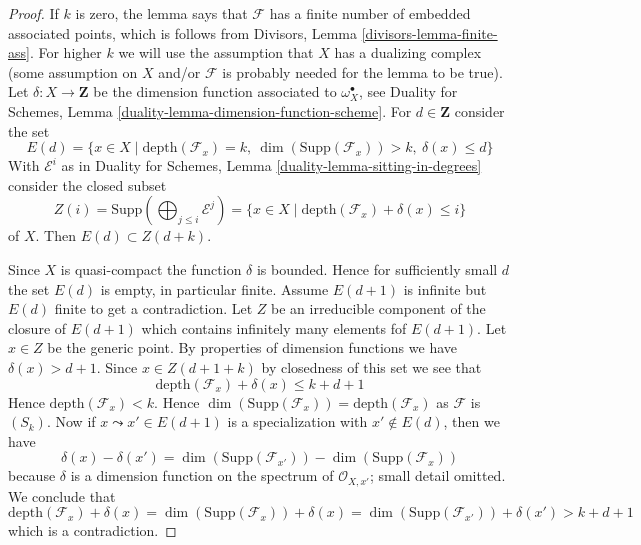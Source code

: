 \begin{proof}
If $k$ is zero, the lemma says that $\mathcal{F}$ has a finite number
of embedded associated points, which is follows from
Divisors, Lemma \ref{divisors-lemma-finite-ass}.
For higher $k$ we will use the assumption
that $X$ has a dualizing complex (some assumption
on $X$ and/or $\mathcal{F}$ is probably needed for the lemma to be true).
Let $\delta : X \to \mathbf{Z}$ be the dimension function associated
to $\omega_X^\bullet$, see Duality for Schemes, Lemma
\ref{duality-lemma-dimension-function-scheme}.
For $d \in \mathbf{Z}$ consider the set
$$
E(d) = \{x \in X \mid
\text{depth}(\mathcal{F}_x) = k,
\ \dim(\text{Supp}(\mathcal{F}_x)) > k,
\ \delta(x) \leq d\}
$$
With $\mathcal{E}^i$ as in
Duality for Schemes, Lemma
\ref{duality-lemma-sitting-in-degrees}
consider the closed subset
$$
Z(i) = \text{Supp}(\bigoplus\nolimits_{j \leq i} \mathcal{E}^j) =
\{x \in X \mid \text{depth}(\mathcal{F}_x) + \delta(x) \leq i \}
$$
of $X$. Then $E(d) \subset Z(d + k)$.

\medskip\noindent
Since $X$ is quasi-compact the function $\delta$ is bounded.
Hence for sufficiently small $d$ the set $E(d)$ is empty,
in particular finite. Assume $E(d + 1)$ is infinite but $E(d)$
finite to get a contradiction.
Let $Z$ be an irreducible component of the closure of
$E(d + 1)$ which contains infinitely many elements fof $E(d + 1)$.
Let $x \in Z$ be the generic point.
By properties of dimension
functions we have $\delta(x) > d + 1$.
Since $x \in Z(d + 1 + k)$ by closedness of this set we see that
$$
\text{depth}(\mathcal{F}_x) + \delta(x) \leq k + d + 1
$$
Hence $\text{depth}(\mathcal{F}_x) < k$.
Hence $\dim(\text{Supp}(\mathcal{F}_x)) = \text{depth}(\mathcal{F}_x)$
as $\mathcal{F}$ is $(S_k)$.
Now if $x \leadsto x' \in E(d + 1)$ is a specialization
with $x' \not \in E(d)$, then we have
$$
\delta(x) - \delta(x') =
\dim(\text{Supp}(\mathcal{F}_{x'})) -
\dim(\text{Supp}(\mathcal{F}_x))
$$
because $\delta$ is a dimension function on the spectrum of
$\mathcal{O}_{X, x'}$; small detail omitted. We conclude that
$$
\text{depth}(\mathcal{F}_x) + \delta(x) =
\dim(\text{Supp}(\mathcal{F}_x)) + \delta(x) =
\dim(\text{Supp}(\mathcal{F}_{x'})) + \delta(x') > k + d + 1
$$
which is a contradiction.
\end{proof}

